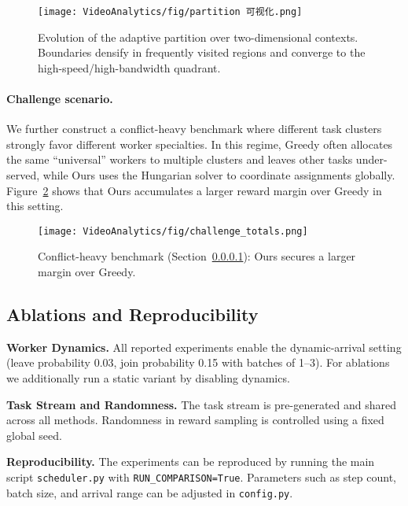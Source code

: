 \begin{figure}[t]
\centering
\texttt{[image: VideoAnalytics/fig/partition 可视化.png]}
\caption{Evolution of the adaptive partition over two-dimensional contexts. Boundaries densify in frequently visited regions and converge to the high-speed/high-bandwidth quadrant.}
\label{fig:partitions}
\end{figure}

\paragraph{Challenge scenario.}\label{sec:challenge}
We further construct a conflict-heavy benchmark where different task clusters strongly favor different worker specialties. In this regime, Greedy often allocates the same “universal” workers to multiple clusters and leaves other tasks under-served, while Ours uses the Hungarian solver to coordinate assignments globally. Figure~\ref{fig:challenge_totals} shows that Ours accumulates a larger reward margin over Greedy in this setting.

\begin{figure}[t]
\centering
\texttt{[image: VideoAnalytics/fig/challenge\_totals.png]}
\caption{Conflict-heavy benchmark (Section~\ref{sec:challenge}): Ours secures a larger margin over Greedy.}
\label{fig:challenge_totals}
\end{figure}

\subsection{Ablations and Reproducibility}

\textbf{Worker Dynamics.} All reported experiments enable the dynamic-arrival setting (leave probability 0.03, join probability 0.15 with batches of 1–3). For ablations we additionally run a static variant by disabling dynamics.

\textbf{Task Stream and Randomness.} The task stream is pre-generated and shared across all methods. Randomness in reward sampling is controlled using a fixed global seed.

\textbf{Reproducibility.} The experiments can be reproduced by running the main script \texttt{scheduler.py} with \texttt{RUN\_COMPARISON=True}. Parameters such as step count, batch size, and arrival range can be adjusted in \texttt{config.py}.

